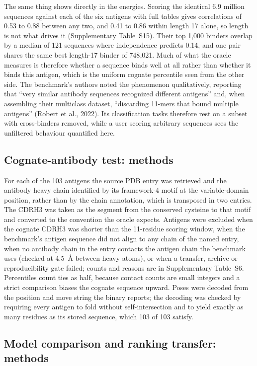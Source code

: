 \documentclass[11pt,a4paper]{article}
\begin{document}
The same thing shows directly in the energies. Scoring the identical 6.9
million sequences against each of the six antigens with full tables gives
correlations of 0.53 to 0.88 between any two, and 0.41 to 0.86 within length 17
alone, so length is not what drives it (Supplementary Table~S15). Their top
1{,}000 binders overlap by a median of 121 sequences where independence
predicts 0.14, and one pair shares the same best length-17 binder of
748{,}021. Much of what the oracle measures is therefore whether a sequence
binds well at all rather than whether it binds this antigen, which is the
uniform cognate percentile seen from the other side. The benchmark's authors
noted the phenomenon qualitatively, reporting that ``very similar antibody
sequences recognized different antigens'' and, when assembling their multiclass
dataset, ``discarding 11-mers that bound multiple antigens'' (Robert et al., 2022).
Its classification tasks therefore rest on a subset with cross-binders removed,
while a user scoring arbitrary sequences sees the unfiltered behaviour
quantified here.

\subsection*{Cognate-antibody test: methods}

For each of the 103 antigens the source PDB entry was retrieved and the
antibody heavy chain identified by its framework-4 motif at the variable-domain
position, rather than by the chain annotation, which is transposed in two
entries. The CDRH3 was taken as the segment from the conserved cysteine to that
motif and converted to the convention the oracle expects. Antigens were
excluded when the cognate CDRH3 was shorter than the 11-residue scoring window,
when the benchmark's antigen sequence did not align to any chain of the named
entry, when no antibody chain in the entry contacts the antigen chain the
benchmark uses (checked at 4.5~\AA{} between heavy atoms), or when a transfer,
archive or reproducibility gate failed; counts and reasons are in
Supplementary Table~S6. Percentiles count ties as half, because contact counts
are small integers and a strict comparison biases the cognate sequence upward.
Poses were decoded from the position and move string the binary reports; the
decoding was checked by requiring every antigen to fold without
self-intersection and to yield exactly as many residues as its stored sequence,
which 103 of 103 satisfy.

\subsection*{Model comparison and ranking transfer: methods}
\end{document}
